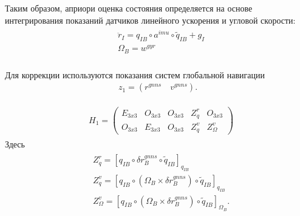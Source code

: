 \documentclass[a4paper,12pt]{article}
\begin{document}
Таким образом, априори оценка состояния определяется на основе интегрирования показаний датчиков линейного ускорения и угловой скорости: 
\begin{align} \label{eq:rddot_i_calib}
\begin{split}
&\ddot{r}_{I} = {q}_{IB} \circ  a^{imu} \circ \tilde{q}_{IB} + g_I \\
&\Omega_B = w^{\textit{gyr}} \\
\end{split}
\end{align}

Для коррекции используются показания систем глобальной навигации
\begin{align}
z_1 = (r^{gnns} \quad v^{gnns}).
\end{align}

\begin{align}
\begin{split}
&H_1 =
\begin{pmatrix}
E_{3x3} & O_{3x3} & O_{3x3} & Z^r_q & O_{3x3}   \\
O_{3x3} & E_{3x3} & O_{3x3} & Z^v_q & Z^v_{\Omega}
\end{pmatrix}
\end{split}
\end{align}
Здесь
\begin{align}
\begin{split}
&Z^r_q = [q_{IB} \circ \delta r^{gnns}_B \circ \tilde{q}_{IB}]_{ q_{IB}} \\
&Z^v_q = [q_{IB} \circ  (\Omega_B \times \delta r^{gnns}_B) \circ \tilde{q}_{IB}]_{ q_{IB}} \\
&Z^v_\Omega = [q_{IB} \circ  (\Omega_B \times \delta r^{gnns}_B) \circ \tilde{q}_{IB}]_{ \Omega_B}.
\end{split}
\end{align}
\end{document}
